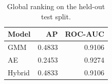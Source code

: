 \begin{table}[H]
\centering\footnotesize\setlength{\tabcolsep}{3pt}
\caption{Global ranking on the held-out test split.}
\label{tab:ranking}
\begin{tabular}{lrr}
\toprule
Model & AP & ROC-AUC \\
\midrule
GMM & 0.4833 & 0.9106 \\
AE & 0.2453 & 0.9274 \\
Hybrid & 0.4833 & 0.9106 \\
\bottomrule
\end{tabular}
\end{table}
